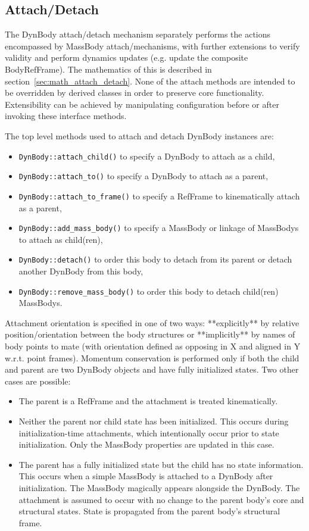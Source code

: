 \subsection{Attach/Detach}\label{sec:detailed_attach_detach}
The DynBody attach/detach mechanism separately performs the actions encompassed
by MassBody attach/mechanisms, with further extensions to verify validity and
perform dynamics updates (e.g. update the composite BodyRefFrame). The mathematics
of this is described in section~\ref{sec:math_attach_detach}. None of the
attach methods are intended to be overridden by derived classes in order to
preserve core functionality. Extensibility can be achieved by manipulating
configuration before or after invoking these interface methods.

The top level methods used to attach and detach DynBody instances are: \begin{itemize}
\item \verb+DynBody::attach_child()+ to specify a DynBody to attach as a child,
\item \verb+DynBody::attach_to()+ to specify a DynBody to attach as a parent,
\item \verb+DynBody::attach_to_frame()+ to specify a RefFrame to kinematically attach as a parent,
\item \verb+DynBody::add_mass_body()+ to specify a MassBody or linkage of
    MassBodys to attach as child(ren),
\item \verb+DynBody::detach()+ to order this body to detach from its parent
    or detach another DynBody from this body,
\item \verb+DynBody::remove_mass_body()+ to order this body to detach child(ren)
    MassBodys.
\end{itemize}

Attachment orientation is specified in one of two ways: **explicitly** by
relative position/orientation between the body structures or **implicitly** by
names of body points to mate (with orientation defined as opposing in X and
aligned in Y w.r.t. point frames).
Momentum conservation is performed only if both the child and parent are two DynBody objects and
have fully initialized states. Two other cases are possible:
\begin{itemize}
\item The parent is a RefFrame and the attachment is treated kinematically.
\item Neither the parent nor child state has been initialized. This occurs
during initialization-time attachments, which intentionally occur prior
to state initialization. Only the MassBody properties are updated in this case.
\item The parent has a fully initialized state but the child has no state
information. This occurs when a simple MassBody is attached to a DynBody
after initialization. The MassBody magically appears alongside the
DynBody. The attachment is assumed to occur with no change to the parent
body's core and structural states. State is propagated from the parent
body's structural frame.
\end{itemize}

